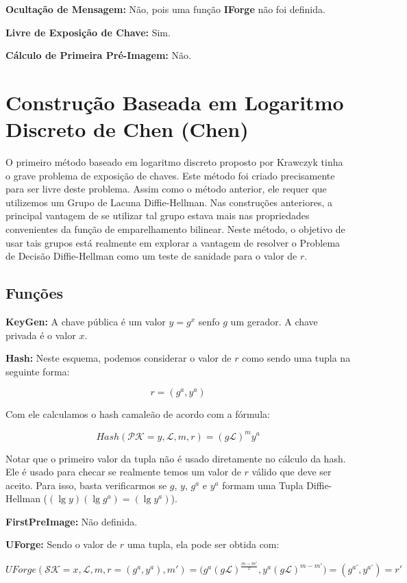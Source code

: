 \documentclass[a4paper]{article}
\begin{document}
\textbf{Ocultação de Mensagem: }Não, pois uma função \textbf{IForge}
não foi definida.

\textbf{Livre de Exposição de Chave: } Sim.

\textbf{Cálculo de Primeira Pré-Imagem: }Não.

\section{Construção Baseada em Logaritmo Discreto de Chen (Chen)
  \cite{chen}}

O primeiro método baseado em logaritmo discreto proposto por Krawczyk
tinha o grave problema de exposição de chaves. Este método foi criado
precisamente para ser livre deste problema. Assim como o método
anterior, ele requer que utilizemos um Grupo de Lacuna
Diffie-Hellman. Nas construções anteriores, a principal vantagem de se
utilizar tal grupo estava mais nas propriedades convenientes da função
de emparelhamento bilinear. Neste método, o objetivo de usar tais
grupos está realmente em explorar a vantagem de resolver o Problema de
Decisão Diffie-Hellman como um teste de sanidade para o valor de $r$.

\subsection{Funções}

\textbf{KeyGen: }A chave pública é um valor $y=g^x$ senfo $g$ um
gerador. A chave privada é o valor $x$.

\textbf{Hash: }Neste esquema, podemos considerar o valor de $r$ como
sendo uma tupla na seguinte forma:

$$
r = (g^a, y^a)
$$

Com ele calculamos o hash camaleão de acordo com a fórmula:

$$
Hash(\mathcal{PK}=y, \mathcal{L}, m, r) = (g\mathcal{L})^my^a
$$

Notar que o primeiro valor da tupla não é usado diretamente no cálculo
da hash. Ele é usado para checar se realmente temos um valor de $r$
válido que deve ser aceito. Para isso, basta verificarmos se $g$, $y$,
$g^a$ e $y^a$ formam uma Tupla Diffie-Hellman ($(\lg y)(\lg g^a) =(\lg
y^a)$).

\textbf{FirstPreImage:} Não definida.

\textbf{UForge:} Sendo o valor de $r$ uma tupla, ela pode ser obtida
com:

$$UForge(\mathcal{SK}=x, \mathcal{L}, m, r=(g^a,y^a), m') =
\big(g^a(g\mathcal{L})^{\frac{m-m'}{x}}, y^a(g\mathcal{L})^{m-m'}\big) =
(g^{a'}, y^{a'}) = r'
$$
\end{document}
